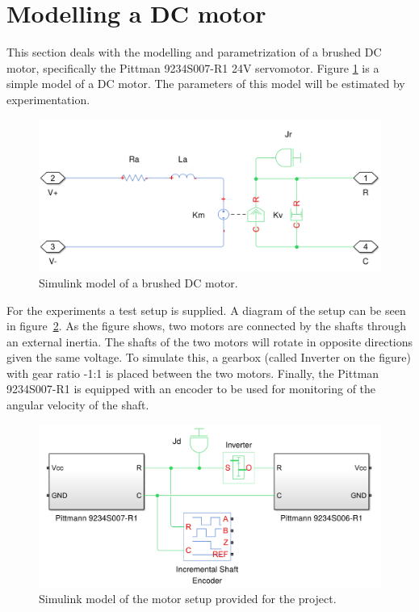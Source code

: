 \section{Modelling a DC motor}
This section deals with the modelling and parametrization of a brushed DC motor, specifically the Pittman 9234S007-R1 24V servomotor.
Figure \ref{fig:dcmotormodel} is a simple model of a DC motor.
The parameters of this model will be estimated by experimentation.


\begin{figure}[!h]
	\centering
	\includegraphics[width=.75\linewidth]{graphics/dcmotormodel.png}
	\caption{Simulink model of a brushed DC motor.}
	\label{fig:dcmotormodel}
\end{figure}

For the experiments a test setup is supplied. 
A diagram of the setup can be seen in figure~\ref{fig:motorsetup}. 
As the figure shows, two motors are connected by the shafts through an external inertia.
The shafts of the two motors will rotate in opposite directions given the same voltage.
To simulate this, a gearbox (called Inverter on the figure) with gear ratio -1:1 is placed between the two motors.
Finally, the Pittman 9234S007-R1 is equipped with an encoder to be used for monitoring of the angular velocity of the shaft.


\begin{figure}[!h]
	\centering
	\includegraphics[width=.8\linewidth]{graphics/motorsetup.png}
	\caption{Simulink model of the motor setup provided for the project.}
	\label{fig:motorsetup}
\end{figure}

